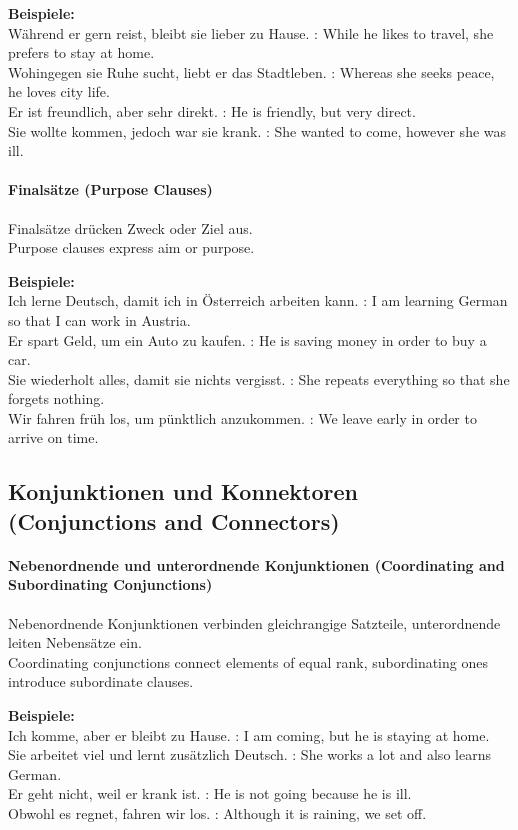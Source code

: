 \documentclass[a4paper]{article}
\begin{document}
        \textbf{Beispiele:}\\
        Während er gern reist, bleibt sie lieber zu Hause. : While he likes to travel, she prefers to stay at home.\\
        Wohingegen sie Ruhe sucht, liebt er das Stadtleben. : Whereas she seeks peace, he loves city life.\\
        Er ist freundlich, aber sehr direkt. : He is friendly, but very direct.\\
        Sie wollte kommen, jedoch war sie krank. : She wanted to come, however she was ill.
    
    \paragraph{Finalsätze {\small (Purpose Clauses)}}
        Finalsätze drücken Zweck oder Ziel aus.\\
        Purpose clauses express aim or purpose.
        
        \textbf{Beispiele:}\\
        Ich lerne Deutsch, damit ich in Österreich arbeiten kann. : I am learning German so that I can work in Austria.\\
        Er spart Geld, um ein Auto zu kaufen. : He is saving money in order to buy a car.\\
        Sie wiederholt alles, damit sie nichts vergisst. : She repeats everything so that she forgets nothing.\\
        Wir fahren früh los, um pünktlich anzukommen. : We leave early in order to arrive on time.
    
    \subsection{Konjunktionen und Konnektoren {\small (Conjunctions and Connectors)}}
    
    \paragraph{Nebenordnende und unterordnende Konjunktionen {\small (Coordinating and Subordinating Conjunctions)}}
        Nebenordnende Konjunktionen verbinden gleichrangige Satzteile, unterordnende leiten Nebensätze ein.\\
        Coordinating conjunctions connect elements of equal rank, subordinating ones introduce subordinate clauses.
        
        \textbf{Beispiele:}\\
        Ich komme, aber er bleibt zu Hause. : I am coming, but he is staying at home.\\
        Sie arbeitet viel und lernt zusätzlich Deutsch. : She works a lot and also learns German.\\
        Er geht nicht, weil er krank ist. : He is not going because he is ill.\\
        Obwohl es regnet, fahren wir los. : Although it is raining, we set off.
    
\end{document}
